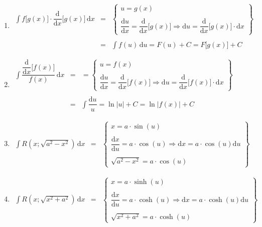 \begin{enumerate}[$(a)$]
\item $\begin{array}{lll}\displaystyle \int f\Big[g\left(x\right)\Big]\cdot \dfrac{\text{d}}{\text{d}x}\Big[g\left(x\right)\Big]\,\text{d}x&=&\left\{\begin{matrix}u=g\left(x\right)\\\\\dfrac{\text{d}u}{\text{d}x}=\dfrac{\text{d}}{\text{d}x}\Big[g\left(x\right)\Big]\Rightarrow \text{d}u=\dfrac{\text{d}}{\text{d}x}\Big[g\left(x\right)\Big]\cdot \text{d}x\end{matrix}\right\}\\\\&=&\displaystyle \int f\left(u\right)\,\text{d}u=F\left(u\right)+C=F\Big[g\left(x\right)\Big]+C\end{array}$
\item $\begin{array}{lll}\displaystyle \int \dfrac{\dfrac{\text{d}}{\text{d}x}\Big[f\left(x\right)\Big]}{f\left(x\right)}\,\text{d}x&=&=\left\{\begin{matrix}u=f\left(x\right)\\\\\dfrac{\text{d}u}{\text{d}x}=\dfrac{\text{d}}{\text{d}x}\Big[f\left(x\right)\Big]\Rightarrow \text{d}u=\dfrac{\text{d}}{\text{d}x}\Big[f\left(x\right)\Big]\cdot \text{d}x\end{matrix}\right\}\\\\&=&\displaystyle \int \dfrac{\text{d}u}{u}=\ln\Big\vert u\Big\vert+C=\ln\Big\vert f\left(x\right)\Big\vert+C\end{array}$
\item $\begin{array}{lll}\displaystyle \int R\left(x;\sqrt{a^2-x^2}\right)\,\text{d}x&=&\left\{\begin{matrix}x=a\cdot \sin\left(u\right)\\\\\dfrac{\text{d}x}{\text{d}u}=a\cdot \cos\left(u\right)\Rightarrow \text{d}x=a\cdot \cos\left(u\right)\text{d}u\\\\\sqrt{a^2-x^2}=a\cdot \cos\left(u\right)\end{matrix}\right\}\end{array}$
\item $\begin{array}{lll}\displaystyle \int R\left(x;\sqrt{x^2+a^2}\right)\,\text{d}x&=&\left\{\begin{matrix}x=a\cdot \sinh\left(u\right)\\\\\dfrac{\text{d}x}{\text{d}u}=a\cdot \cosh\left(u\right)\Rightarrow \text{d}x=a\cdot \cosh\left(u\right)\text{d}u\\\\\sqrt{x^2+a^2}=a\cdot \cosh\left(u\right)\end{matrix}\right\}\end{array}$

\end{enumerate}
